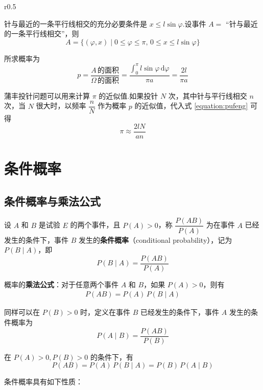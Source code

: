 \begin{solution}
\begin{wrapfigure}[6]{r}{0.5\textwidth}
        \caption{}
        \label{fig:pufeng:2}
    \end{wrapfigure}

    针与最近的一条平行线相交的充分必要条件是 $x \leqslant l \sin \varphi$.设事件 $A=$ “针与最近的一条平行线相交”，则
    $$
    A = \{(\varphi,x) \mid 0 \leqslant \varphi \leqslant \pi, \, 0 \leqslant x \leqslant l \sin \varphi\}
    $$

    所求概率为
    \begin{equation} \label{equation:pufeng}
        p = \dfrac{A\, \text{的面积}}{\varOmega \, \text{的面积}} = \dfrac{\displaystyle\int_0^{\pi} l \sin\varphi \, \text{d} \varphi}{\pi a} = \dfrac{2l}{\pi a}
    \end{equation}
\end{solution}

蒲丰投针问题可以用来计算 $\pi$ 的近似值.如果投针 $N$ 次，其中针与平行线相交 $n$ 次，当 $N$ 很大时，以频率 $\dfrac{n}{N}$ 作为概率 $p$ 的近似值，代入式 \eqref{equation:pufeng} 可得
$$
\pi \approx \dfrac{2lN}{an}
$$

\section{条件概率}

\subsection{条件概率与乘法公式}

\begin{definition}
    设 $A$ 和 $B$ 是试验 $E$ 的两个事件，且 $P(A)>0$，称 $\dfrac{P(AB)}{P(A)}$ 为在事件 $A$ 已经发生的条件下，事件 $B$ 发生的\textbf{条件概率}（conditional probability），记为 $P(B \mid A)$，即
    $$
    P(B \mid A)=\dfrac{P(AB)}{P(A)}
    $$
\end{definition}

概率的\textbf{乘法公式}：对于任意两个事件 $A$ 和 $B$，如果 $P(A)>0$，则有
\begin{align} \label{equation:multiply}
    P(AB)=P(A) \, P(B \mid A)
\end{align}

同样可以在 $P(B)>0$ 时，定义在事件 $B$ 已经发生的条件下，事件 $A$ 发生的条件概率为
$$
P(A \mid B)=\dfrac{P(AB)}{P(B)}
$$

在 $P(A)>0,P(B)>0$ 的条件下，有
$$
P(AB) = P(A) \, P(B \mid A) = P(B) \, P(A \mid B)
$$

条件概率具有如下性质：

\setcounter{propertyname}{0}

